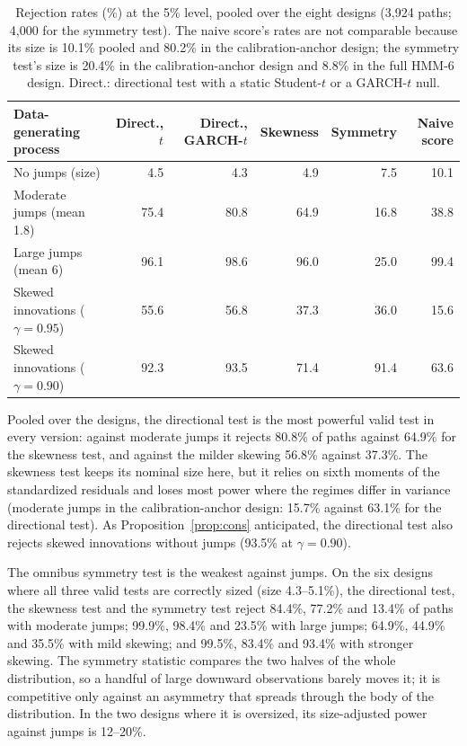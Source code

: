 \documentclass[11pt,a4paper]{article}
\theoremstyle{definition}
\theoremstyle{remark}
\begin{document}
\begin{table}[ht]\centering\footnotesize\setlength{\tabcolsep}{4pt}
\caption{Rejection rates (\%) at the 5\% level, pooled over the eight designs (3{,}924 paths; 4{,}000 for the symmetry test). The naive score's rates are not comparable because its size is 10.1\% pooled and 80.2\% in the calibration-anchor design; the symmetry test's size is 20.4\% in the calibration-anchor design and 8.8\% in the full HMM-6 design. Direct.: directional test with a static Student-$t$ or a GARCH-$t$ null.}\label{tab:b12}
\begin{tabular}{lrrrrr}
\toprule
Data-generating process & Direct., $t$ & Direct., GARCH-$t$ & Skewness & Symmetry & Naive score\\
\midrule
No jumps (size) & 4.5 & 4.3 & 4.9 & 7.5 & 10.1\\
Moderate jumps (mean 1.8) & 75.4 & 80.8 & 64.9 & 16.8 & 38.8\\
Large jumps (mean 6) & 96.1 & 98.6 & 96.0 & 25.0 & 99.4\\
Skewed innovations ($\gamma=0.95$) & 55.6 & 56.8 & 37.3 & 36.0 & 15.6\\
Skewed innovations ($\gamma=0.90$) & 92.3 & 93.5 & 71.4 & 91.4 & 63.6\\
\bottomrule
\end{tabular}
\end{table}

Pooled over the designs, the directional test is the most powerful valid test in every version: against moderate jumps it rejects 80.8\% of paths against 64.9\% for the skewness test, and against the milder skewing 56.8\% against 37.3\%. The skewness test keeps its nominal size here, but it relies on sixth moments of the standardized residuals and loses most power where the regimes differ in variance (moderate jumps in the calibration-anchor design: 15.7\% against 63.1\% for the directional test). As Proposition~\ref{prop:cons} anticipated, the directional test also rejects skewed innovations without jumps (93.5\% at $\gamma=0.90$).

The omnibus symmetry test is the weakest against jumps. On the six designs where all three valid tests are correctly sized (size 4.3--5.1\%), the directional test, the skewness test and the symmetry test reject 84.4\%, 77.2\% and 13.4\% of paths with moderate jumps; 99.9\%, 98.4\% and 23.5\% with large jumps; 64.9\%, 44.9\% and 35.5\% with mild skewing; and 99.5\%, 83.4\% and 93.4\% with stronger skewing. The symmetry statistic compares the two halves of the whole distribution, so a handful of large downward observations barely moves it; it is competitive only against an asymmetry that spreads through the body of the distribution. In the two designs where it is oversized, its size-adjusted power against jumps is 12--20\%.
\end{document}
